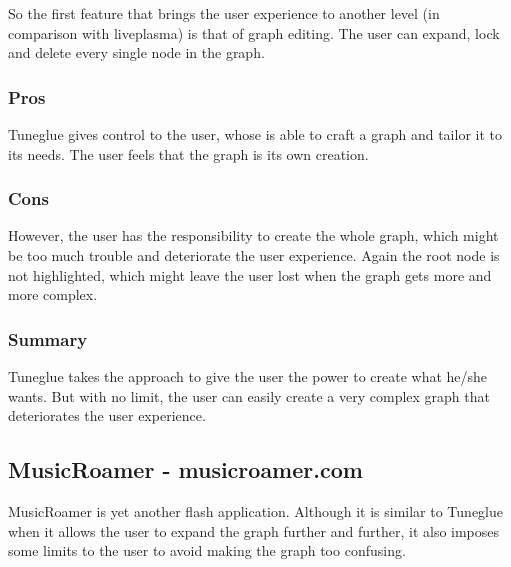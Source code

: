     So the first feature that brings the user experience to another level (in comparison with liveplasma) is that of graph editing.
    The user can expand, lock and delete every single node in the graph.


    \subsubsection{Pros} %
    \label{ssub:audiomap_pros}

      Tuneglue gives control to the user, whose is able to craft a graph and tailor it to its needs.
      The user feels that the graph is its own creation.


    \subsubsection{Cons} %
    \label{ssub:audiomap_cons}

      However, the user has the responsibility to create the whole graph, which might be too much trouble and deteriorate the user experience.
      Again the root node is not highlighted, which might leave the user lost when the graph gets more and more complex.


    \subsubsection{Summary} %
    \label{ssub:audiomap_summary}

      Tuneglue takes the approach to give the user the power to create what he/she wants.
      But with no limit, the user can easily create a very complex graph that deteriorates the user experience.




  \subsection{MusicRoamer - musicroamer.com} %
  \label{sub:musicroamer}

    MusicRoamer is yet another flash application.
    Although it is similar to Tuneglue when it allows the user to expand the graph further and further, it also imposes some limits to the user to avoid making the graph too confusing.

